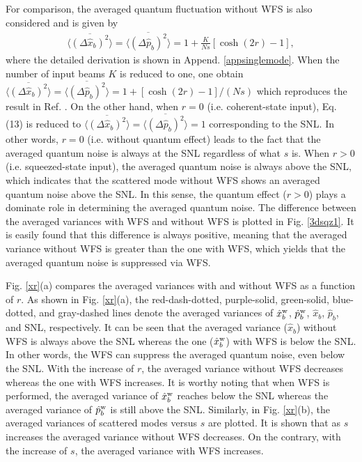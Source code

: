 \documentclass[9pt,twocolumn,twoside]{osajnl}
\begin{document}
For comparison, the averaged quantum fluctuation without WFS is also considered and is given by 
\begin{align}
\label{sqz1var2xxx}
\overline{\langle (\Delta \hat{x}_{b})^2 \rangle} = \overline{\langle (\Delta \hat{p}_{b})^2 \rangle} = 1+ \frac{K}{Ns} [\cosh (2r) - 1],
\end{align}
where the detailed derivation is shown in Append. \ref{appsinglemode}. When the number of input beams $K$ is reduced to one, one obtain $\overline{\langle (\Delta \hat{x}_{b})^2 \rangle} = \overline{\langle (\Delta \hat{p}_{b})^2 \rangle} = 1+ [\cosh (2r) - 1]/(Ns)$ which reproduces the result in Ref. \cite{lodahl2006b}. On the other hand, when $r=0$ (i.e. coherent-state input), Eq. (13) is reduced to $\overline{\langle (\Delta \hat{x}_{b})^2 \rangle} = \overline{\langle (\Delta \hat{p}_{b})^2 \rangle} = 1$ corresponding to the SNL. In other words, $r=0$ (i.e. without quantum effect) leads to the fact that the averaged quantum noise is always at the SNL regardless of what $s$ is. When $r>0$ (i.e. squeezed-state input), the averaged quantum noise is always above the SNL, which indicates that the scattered mode without WFS shows an averaged quantum noise above the SNL. In this sense, the quantum effect ($r> 0$) plays a dominate role in determining the averaged quantum noise. The difference between the averaged variances with WFS and without WFS is plotted in Fig. \ref{3dsqz1}. It is easily found that this difference is always positive, meaning that the averaged variance without WFS is greater than the one with WFS, which yields that the averaged quantum noise is suppressed via WFS. 

Fig. \ref{xr}(a) compares the averaged variances with and without WFS as a function of $r$. As shown in Fig. \ref{xr}(a), the red-dash-dotted, purple-solid, green-solid, blue-dotted, and gray-dashed lines denote the averaged variances of $\hat{x}_b^{\rm{w}}$, $\hat{p}_b^{\rm{w}}$, $\hat{x}_b$, $\hat{p}_b$, and SNL, respectively. It can be seen that the averaged variance ($\hat{x}_b$) without WFS is always above the SNL whereas the one ($\hat{x}_b^{\rm{w}}$) with WFS is below the SNL. In other words, the WFS can suppress the averaged quantum noise, even below the SNL. With the increase of $r$, the averaged variance without WFS decreases whereas the one with WFS increases. It is worthy noting that when WFS is performed, the averaged variance of $\hat{x}_b^{\rm{w}}$ reaches below the SNL whereas the averaged variance of $\hat{p}_b^{\rm{w}}$ is still above the SNL. Similarly, in Fig. \ref{xr}(b), the averaged variances of scattered modes versus $s$ are plotted. It is shown that as $s$ increases the averaged variance without WFS decreases. On the contrary, with the increase of $s$, the averaged variance with WFS increases. 
\end{document}
